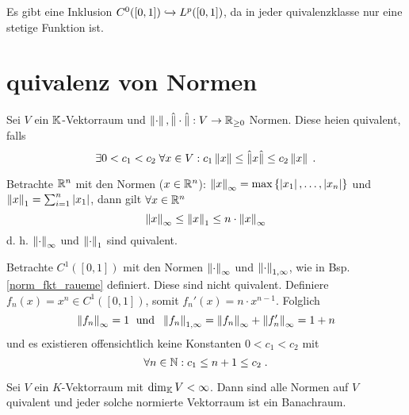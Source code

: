 	\begin{rem}
		Es gibt eine Inklusion \(C^0([0,1])\xhookrightarrow{} L^p([0,1])\), da in jeder \As quivalenzklasse nur eine stetige Funktion ist.
	\end{rem}
	
	\section{\As quivalenz von Normen}
	\begin{definition}
		Sei $V$ ein $\mathbb{K}$-Vektorraum und \(\left\lVert\cdot\right\rVert, \hat\lVert\cdot\hat\rVert: V \to \mathbb{R}_{\geq 0}\) Normen. Diese hei\s en \as quivalent, falls
		\[\exists 0 < c_1 < c_2 \; \forall x \in V : c_1 \left\lVert x\right\rVert \leq \hat\lVert x\hat\rVert \leq c_2 \left\lVert x\right\rVert\;.\]
	\end{definition}
	
	\begin{ex}
		Betrachte \(\mathbb{R}^n\) mit den Normen (\(x\in\mathbb{R}^n\)): \(\left\lVert x\right\rVert_\infty = \max\left\{\left\lvert x_1 \right\rvert,\ldots, \left\lvert x_n \right\rvert\right\}\) und \(\left\lVert x\right\rVert_{1} = \sum_{i=1}^n \left\lvert x_1 \right\rvert\), dann gilt \(\forall x\in \mathbb{R}^n\)
		\[\left\lVert x\right\rVert_\infty \leq \left\lVert x\right\rVert_{1} \leq n\cdot \left\lVert x\right\rVert_\infty\]
		d. h. \(\left\lVert\cdot\right\rVert_\infty\) und \(\left\lVert\cdot\right\rVert_{1}\) sind \as quivalent.
	\end{ex}
	
	\begin{ex}
		Betrachte \(C^1([0,1])\) mit den Normen \(\left\lVert\cdot\right\rVert_\infty \) und \(\left\lVert\cdot\right\rVert_{1,\infty}\), wie in Bsp. \ref{norm_fkt_raueme} definiert. Diese sind nicht \as quivalent. Definiere \(f_n(x) = x^n \in C^1([0,1])\), somit \(f_n'(x) = n \cdot x^{n-1}\). Folglich
		\[\left\lVert f_n\right\rVert_\infty = 1 \;\text { und }\; \left\lVert f_n\right\rVert_{1, \infty} = \left\lVert f_n\right\rVert_\infty + \left\lVert f_n'\right\rVert_\infty = 1 + n\] 
		und es existieren offensichtlich keine Konstanten \(0<c_1<c_2\) mit 
		\[\forall n \in \mathbb{N}: c_1 \leq n+1 \leq c_2\;.\]
	\end{ex}
	
	\begin{theorem}
		Sei $V$ ein $K$-Vektorraum mit \(\dim_{\mathbb{K}} V < \infty\). Dann sind alle Normen auf $V$ \as quivalent und jeder solche normierte Vektorraum ist ein Banachraum.
	\end{theorem}